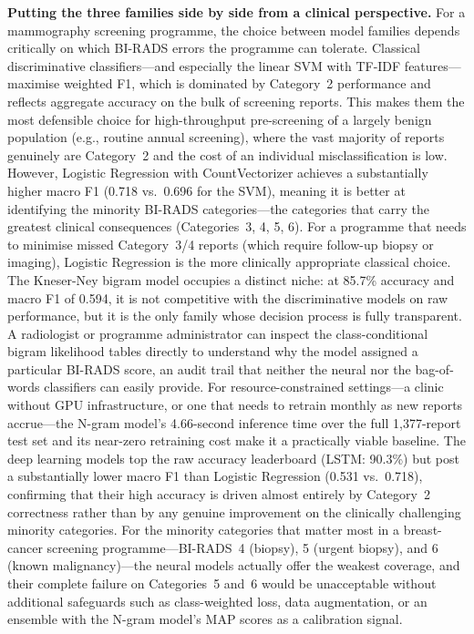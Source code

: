 \documentclass[11pt,a4paper]{article}
\begin{document}
\textbf{Putting the three families side by side from a clinical perspective.}
For a mammography screening programme, the choice between model families
depends critically on which BI-RADS errors the programme can tolerate.
Classical discriminative classifiers---and especially the linear SVM with
TF-IDF features---maximise weighted F1, which is dominated by Category~2
performance and reflects aggregate accuracy on the bulk of screening reports.
This makes them the most defensible choice for high-throughput pre-screening
of a largely benign population (e.g., routine annual screening), where the
vast majority of reports genuinely are Category~2 and the cost of an
individual misclassification is low.
However, Logistic Regression with CountVectorizer achieves a substantially
higher macro F1 (0.718 vs.~0.696 for the SVM), meaning it is better at
identifying the minority BI-RADS categories---the categories that carry the
greatest clinical consequences (Categories~3, 4, 5, 6).
For a programme that needs to minimise missed Category~3/4 reports (which
require follow-up biopsy or imaging), Logistic Regression is the more
clinically appropriate classical choice.
The Kneser-Ney bigram model occupies a distinct niche: at 85.7\% accuracy
and macro F1 of 0.594, it is not competitive with the discriminative models
on raw performance, but it is the only family whose decision process is fully
transparent.
A radiologist or programme administrator can inspect the class-conditional
bigram likelihood tables directly to understand why the model assigned a
particular BI-RADS score, an audit trail that neither the neural nor the
bag-of-words classifiers can easily provide.
For resource-constrained settings---a clinic without GPU infrastructure, or
one that needs to retrain monthly as new reports accrue---the N-gram model's
4.66-second inference time over the full 1{,}377-report test set and its
near-zero retraining cost make it a practically viable baseline.
The deep learning models top the raw accuracy leaderboard (LSTM: 90.3\%) but
post a substantially lower macro F1 than Logistic Regression (0.531 vs.\ 0.718),
confirming that their high accuracy is driven almost entirely by Category~2
correctness rather than by any genuine improvement on the clinically
challenging minority categories.
For the minority categories that matter most in a breast-cancer screening
programme---BI-RADS~4 (biopsy), 5 (urgent biopsy), and 6 (known
malignancy)---the neural models actually offer the weakest coverage, and
their complete failure on Categories~5 and~6 would be unacceptable without
additional safeguards such as class-weighted loss, data augmentation, or
an ensemble with the N-gram model's MAP scores as a calibration signal.
\end{document}
